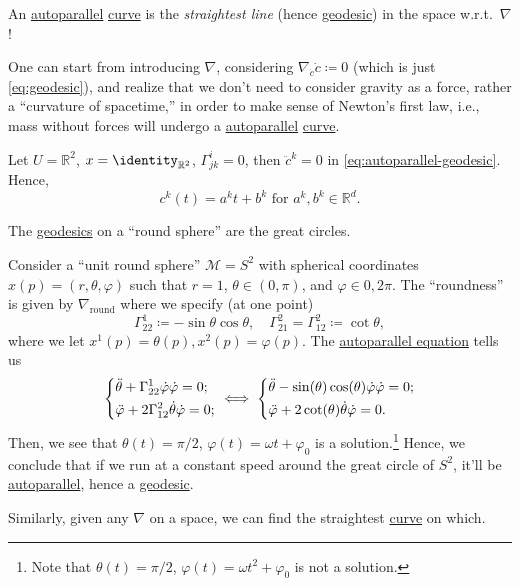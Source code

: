 \begin{intuition}
	An \hyperref[def:autoparallel]{autoparallel} \hyperref[def:curve]{curve} is the \emph{straightest line} (hence \hyperref[def:geodesic]{geodesic}) in the space w.r.t.\ \(\nabla \)!
\end{intuition}

\begin{remark}
	One can start from introducing \(\nabla \), considering \(\nabla _{\dot{c} }\dot{c} \coloneqq 0 \) (which is just \autoref{eq:geodesic}), and realize that we don't need to consider gravity as a force, rather a ``curvature of spacetime,'' in order to make sense of Newton's first law, i.e., mass without forces will undergo a \hyperref[def:autoparallel]{autoparallel} \hyperref[def:curve]{curve}.
\end{remark}

\begin{eg}
	Let \(U = \mathbb{R} ^2\), \(x = \identity_{\mathbb{R} ^2} \), \(\Gamma ^i_{jk} = 0\), then \(\ddot{c} ^k = 0 \) in \autoref{eq:autoparallel-geodesic}. Hence,
	\[
		c^k (t) = a^k t + b^k \text{ for } a^k, b^k\in \mathbb{R} ^d.
	\]
\end{eg}

\begin{eg}
	The \hyperref[def:geodesic]{geodesics} on a ``round sphere'' are the great circles.
\end{eg}
\begin{explanation}
	Consider a ``unit round sphere'' \(\mathcal{M} = S^2\) with spherical coordinates \(x(p) = (r, \theta , \varphi )\) such that \(r=1\), \(\theta \in(0, \pi )\), and \(\varphi \in 0, 2\pi \). The ``roundness'' is given by \(\nabla _{\text{round}}\) where we specify (at one point)
	\[
		\Gamma^1_{22} \coloneqq - \sin \theta \cos \theta ,\quad
		\Gamma^2_{21} = \Gamma^2_{12} \coloneqq \cot \theta,
	\]
	where we let \(x^1(p) = \theta (p), x^2(p) = \varphi (p)\). The \hyperref[def:autoparallel]{autoparallel equation} tells us
	\[
		\begin{dcases}
			\ddot{\theta } + \Gamma ^1_{22} \dot{\varphi } \dot{\varphi } = 0; \\
			\ddot{\varphi } + 2\Gamma ^2_{12} \dot{\theta } \dot{\varphi } = 0;
		\end{dcases}
		\iff \begin{dcases}
			\ddot{\theta } - \sin (\theta) \cos (\theta) \dot{\varphi } \dot{\varphi } = 0; \\
			\ddot{\varphi } + 2 \cot (\theta) \dot{\theta } \dot{\varphi } = 0.
		\end{dcases}
	\]
	Then, we see that \(\theta (t) = \pi / 2\), \(\varphi (t) = \omega t + \varphi _0\) is a solution.\footnote{Note that \(\theta (t) = \pi / 2\), \(\varphi (t) = \omega t^2 + \varphi _0\) is not a solution.} Hence, we conclude that if we run at a constant speed around the great circle of \(S^2\), it'll be \hyperref[def:autoparallel]{autoparallel}, hence a \hyperref[def:geodesic]{geodesic}.
\end{explanation}

Similarly, given any \(\nabla \) on a space, we can find the straightest \hyperref[def:curve]{curve} on which.